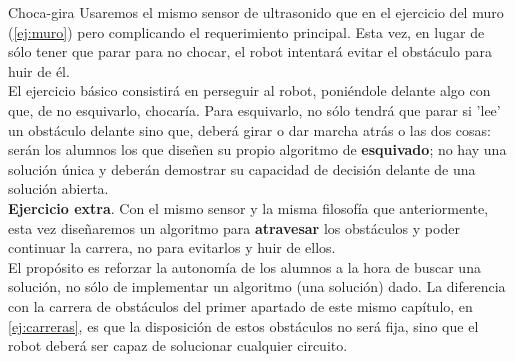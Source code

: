 \begin{description}
\item{Choca-gira}\label{ej:chocaGira}
Usaremos el mismo sensor de ultrasonido que en el ejercicio del muro (\ref{ej:muro}) pero complicando el requerimiento principal. Esta vez, en lugar de sólo tener que parar para no chocar, el robot intentará evitar el obstáculo para huir de él. \\
El ejercicio básico consistirá en perseguir al robot, poniéndole delante algo con que, de no esquivarlo, chocaría. Para esquivarlo, no sólo tendrá que parar si 'lee' un obstáculo delante sino que, deberá girar o dar marcha atrás o las dos cosas: serán los alumnos los que diseñen su propio algoritmo de \textbf{esquivado}; no hay una solución única y deberán demostrar su capacidad de decisión delante de una solución abierta. \\
\textbf{Ejercicio extra}. Con el mismo sensor y la misma filosofía que anteriormente, esta vez diseñaremos un algoritmo para \textbf{atravesar} los obstáculos y poder continuar la carrera, no para evitarlos y huir de ellos. \\
El propósito es reforzar la autonomía de los alumnos a la hora de buscar una solución, no sólo de implementar un algoritmo (una solución) dado. La diferencia con la carrera de obstáculos del primer apartado de este mismo capítulo, en \ref{ej:carreras}, es que la disposición de estos obstáculos no será fija, sino que el robot deberá ser capaz de solucionar cualquier circuito.
\end{description}

